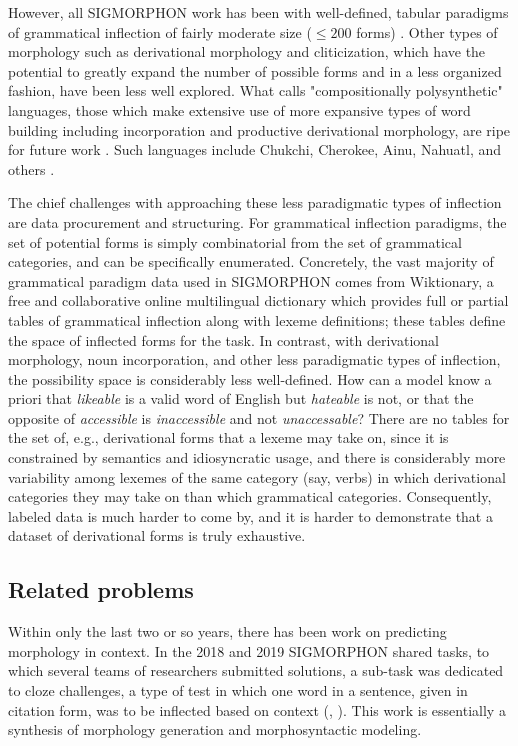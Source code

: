 However, all SIGMORPHON work has been with well-defined, tabular paradigms of grammatical inflection of fairly moderate size ($\leq 200$ forms) \parencite{Cotterell2018b}. Other types of morphology such as derivational morphology and cliticization, which have the potential to greatly expand the number of possible forms and in a less organized fashion, have been less well explored. What \cite{Mattissen2004} calls "compositionally polysynthetic" languages, those which make extensive use of more expansive types of word building including incorporation and productive derivational morphology, are ripe for future work \parencite{Cotterell2016}. Such languages include Chukchi, Cherokee, Ainu, Nahuatl, and others \parencite{Mattissen2004}.

The chief challenges with approaching these less paradigmatic types of inflection are data procurement and structuring. For grammatical inflection paradigms, the set of potential forms is simply combinatorial from the set of grammatical categories, and can be specifically enumerated. Concretely, the vast majority of grammatical paradigm data used in SIGMORPHON comes from Wiktionary, a free and collaborative online multilingual dictionary which provides full or partial tables of grammatical inflection along with lexeme definitions; these tables define the space of inflected forms for the task. In contrast, with derivational morphology, noun incorporation, and other less paradigmatic types of inflection, the possibility space is considerably less well-defined. How can a model know a priori that \textit{likeable} is a valid word of English but \textit{hateable} is not, or that the opposite of \textit{accessible} is \textit{inaccessible} and not \textit{unaccessable}? There are no tables for the set of, e.g., derivational forms that a lexeme may take on, since it is constrained by semantics and idiosyncratic usage, and there is considerably more variability among lexemes of the same category (say, verbs) in which derivational categories they may take on than which grammatical categories. Consequently, labeled data is much harder to come by, and it is harder to demonstrate that a dataset of derivational forms is truly exhaustive.

\subsection{Related problems}

Within only the last two or so years, there has been work on predicting morphology in context. In the 2018 and 2019 SIGMORPHON shared tasks, to which several teams of researchers submitted solutions, a sub-task was dedicated to cloze challenges, a type of test in which one word in a sentence, given in citation form, was to be inflected based on context (\cite{Cotterell2018b}, \cite{McCarthy2019}). This work is essentially a synthesis of morphology generation and morphosyntactic modeling.

